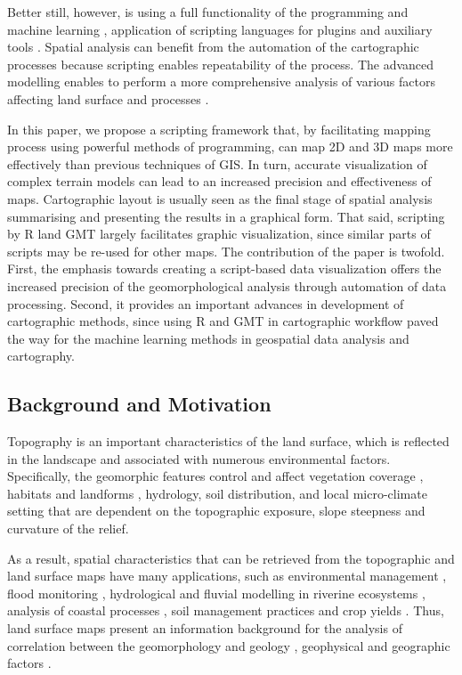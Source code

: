 \documentclass[land,article,submit,pdftex,moreauthors]{Definitions/mdpi}
\begin{document}
Better still, however, is using a full functionality of the programming and machine learning \cite{OUATTARA202015777,LEMENKOVA_2019}, application of scripting languages for plugins and auxiliary tools \cite{NAGHIBI2021101232,GUO2022105354,Lemenkov2021,SEBBAH2021104972,CHEN2022105362}. Spatial analysis can benefit from the automation of the cartographic processes because scripting enables repeatability of the process. The advanced modelling enables to perform a more comprehensive analysis of various factors affecting land surface and processes \cite{KAPPES2012139}. 

In this paper, we propose a scripting framework that, by facilitating mapping process using powerful methods of programming, can map 2D and 3D maps more effectively than previous techniques of GIS. In turn, accurate visualization of complex terrain models can lead to an increased precision and effectiveness of maps. Cartographic layout is usually seen as the final stage of spatial analysis summarising and presenting the results in a graphical form. That said, scripting by R land GMT largely facilitates graphic visualization, since similar parts of scripts may be re-used for other maps. The contribution of the paper is twofold. First, the emphasis towards creating a script-based data visualization offers the increased precision of the geomorphological analysis through automation of data processing. Second, it provides an important advances in development of cartographic methods, since using R and GMT in cartographic workflow paved the way for the machine learning methods in geospatial data analysis and cartography.

\subsection{Background and Motivation}
Topography is an important characteristics of the land surface, which is reflected in the landscape and associated with numerous environmental factors. Specifically, the geomorphic features control and affect vegetation coverage \cite{land10060559,GOMEZ201511}, habitats and landforms \cite{land7030102,land10101031}, hydrology, soil distribution, and local micro-climate setting that are dependent on the topographic exposure, slope steepness and curvature of the relief. 

As a result, spatial characteristics that can be retrieved from the topographic and land surface maps have many applications, such as environmental management  \cite{land6040083}, flood monitoring \cite{HOOKE2020106793}, hydrological and fluvial modelling in riverine ecosystems \cite{SIAKEU2004231,NAKAYAMA201362}, analysis of coastal processes \cite{ITO2022102527}, soil management practices and crop yields \cite{TABUCHI20174,PRIYA2001113,SASAI2012175}. Thus, land surface maps present an information background for the analysis of correlation between the geomorphology and geology \cite{MATSUURA20141}, geophysical and geographic factors \cite{IMAIZUMI2018125}. 
\end{document}
